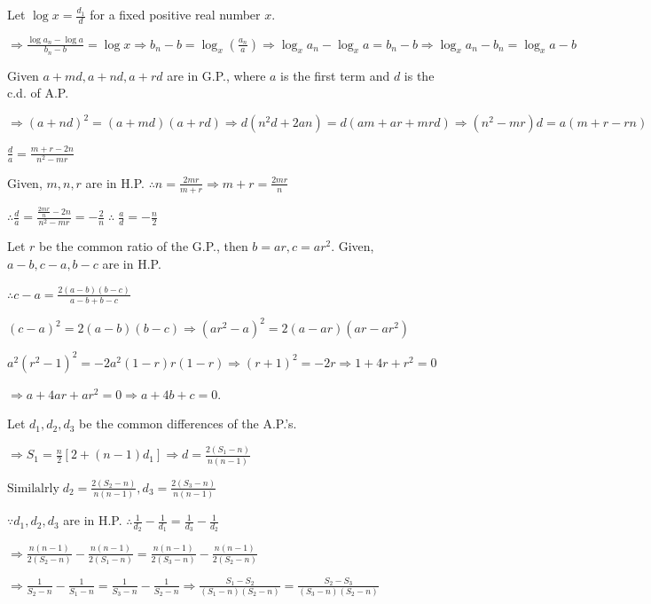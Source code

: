   Let $\log x = \frac{d_1}{d}$ for a fixed positive real number $x.$

  $\Rightarrow \frac{\log a_n - \log a}{b_n - b} = \log x \Rightarrow b_n - b =
  \log_x\left(\frac{a_n}{a}\right)\Rightarrow \log_x a_n - \log_x a = b_n - b \Rightarrow \log_x a_n - b_n =
  \log_x a - b$
\item Given $a + md, a + nd, a + rd$ are in G.P., where $a$ is the first term and $d$ is the c.d. of A.P.

  $\Rightarrow (a + nd)^2 = (a + md)(a + rd)\Rightarrow d(n^2d + 2an) = d(am + ar + mrd)\Rightarrow (n^2 -
  mr)d = a(m + r - rn)$

  $\frac{d}{a} = \frac{m + r - 2n}{n^2 - mr}$

  Given, $m, n, r$ are in H.P. $\therefore n = \frac{2mr}{m + r} \Rightarrow m + r = \frac{2mr}{n}$

  $\therefore \frac{d}{a} = \frac{\frac{2mr}{n} - 2n}{n^2 - mr} = -\frac{2}{n}\;\therefore\; \frac{a}{d} =
  -\frac{n}{2}$
\item Let $r$ be the common ratio of the G.P., then $b = ar, c = ar^2.$ Given, $a - b, c - a, b - c$ are in H.P.

  $\therefore c - a = \frac{2(a - b)(b - c)}{a - b + b - c}$

  $(c - a)^2 = 2(a - b)(b - c)\Rightarrow (ar^2 - a)^2 = 2(a - ar)(ar - ar^2)$

  $a^2(r^2 - 1)^2 = -2a^2(1 - r)r(1 - r)\Rightarrow (r + 1)^2 = -2r \Rightarrow 1 + 4r + r^2 = 0$

  $\Rightarrow a + 4ar + ar^2 = 0 \Rightarrow a + 4b + c = 0$.
\item Let $d_1, d_2, d_3$ be the common differences of the A.P.'s.

  $\Rightarrow S_1 = \frac{n}{2}[2 + (n - 1)d_1]\Rightarrow d = \frac{2(S_1 - n)}{n(n - 1)}$

  $\text{Similalrly}\;d_2 = \frac{2(S_2 - n)}{n(n - 1)}, d_3 = \frac{2(S_3 - n)}{n(n - 1)}$

  $\because d_1, d_2, d_3$ are in H.P. $\therefore \frac{1}{d_2} - \frac{1}{d_1} = \frac{1}{d_3} - \frac{1}{d_2}$

  $\Rightarrow \frac{n(n - 1)}{2(S_2 - n)} - \frac{n(n - 1)}{2(S_1 - n)} = \frac{n(n - 1)}{2(S_3 - n)} -
  \frac{n(n - 1)}{2(S_2 - n)}$

  $\Rightarrow \frac{1}{S_2 - n} - \frac{1}{S_1 - n} = \frac{1}{S_3 -n} - \frac{1}{S_2 -n}\Rightarrow
  \frac{S_1 - S_2}{(S_1 - n)(S_2 - n)} = \frac{S_2 - S_3}{(S_3 - n)(S_2 - n)}$

